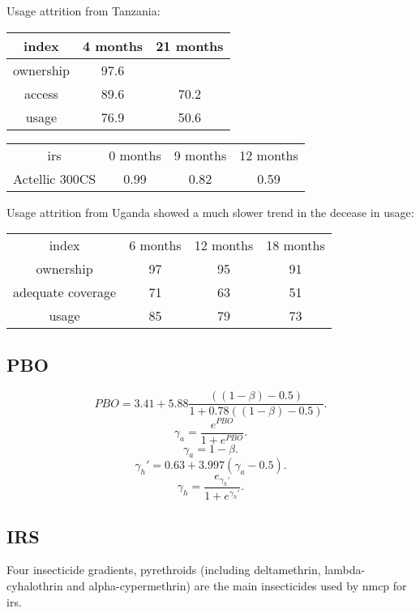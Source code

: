 \documentclass[a4paper, 12pt, twoside]{article}
\begin{document}
Usage attrition from Tanzania\cite{Protopopoff2018}:

\begin{center}
\begin{tabular}{c c c}
  \toprule
  index & 4 months & 21 months\\ 
  \midrule
  ownership & 97.6 &  \\  
  access & 89.6 & 70.2\\
  usage & 76.9 & 50.6\\
  \bottomrule
\end{tabular}
\end{center}

\begin{center}
\begin{tabular}{c c c c}
  \gls{irs} & 0 months & 9 months & 12 months\\ 
  Actellic 300CS & 0.99 & 0.82 & 0.59  \\  
\end{tabular}
\end{center}

Usage attrition from Uganda\cite{Staedke2020} showed a much slower trend in the decease in usage:

\begin{center}
\begin{tabular}{c c c c}
  index & 6 months & 12 months & 18 months\\ 
  ownership & 97 & 95 & 91 \\  
  adequate coverage & 71 & 63 & 51\\
  usage & 85 & 79 & 73
\end{tabular}
\end{center}

\subsection{PBO}

\[
  PBO = 3.41 + 5.88 \frac{((1-\beta) - 0.5)}{1 + 0.78 ((1-\beta) - 0.5)}
.\] 
\[
  \gamma_a = \frac{e^{PBO}}{1 + e^{PBO}}
.\] 
\[
  \gamma_a = 1 - \beta
.\] 
\[
\gamma_h' = 0.63 + 3.997 ( \gamma_a - 0.5 )
.\] 
\[
  \gamma_h = \frac{e_{\gamma_h'}}{1+e^{\gamma_h'}}
.\] 

\subsection{IRS}

Four insecticide gradients, pyrethroids (including deltamethrin, lambda-cyhalothrin and alpha-cypermethrin) are the main insecticides used by \gls{nmcp} for \gls{irs}.
\end{document}
